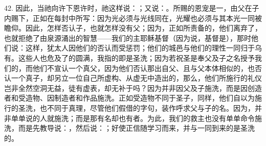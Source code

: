 42. 因此，当祂向许下恩许时，祂这样说：；又说：。所赐的恩宠是一，由父在子内赐下，正如在每封中所写：因为光必须与光线同在，光耀也必须与其本光一同被瞻仰。因此，怎样否认子，也就怎样没有父；因为，正如所责备的，他们离弃了，也就拒绝了由泉源涌出的智慧——我们的主耶稣基督（因为说，基督是），那时他们说：这样，犹太人因他们的否认而受惩罚；他们的城邑与他们的理性一同归于乌有。这些人也危及了的圆满，我指的即是圣洗；因为若祝圣是奉父及子之名授予我们的，而他们不宣认一个真父，因为他们否认那出自父、且与父本体相似的，也否认一个真子，却另立一位自己所虚构、从虚无中造出的，那么，他们所施行的礼仪岂非全然空洞无益，徒有虚表，却无补于吗？因为并非因父及子施洗，而是因创造者和受造物、因制造者和作品施洗。正如受造物不同于圣子，同样，他们自以为施行的圣洗，也不同于真理，尽管他们假借的字句，装作呼求父与子的名。因为，并非单单说的人就施洗；而是那有名却也有者。为此，我们的救主也没有单单命令施洗，而是先教导说：，然后说：；好使正信随学习而来，并与一同到来的是圣洗的。\par

